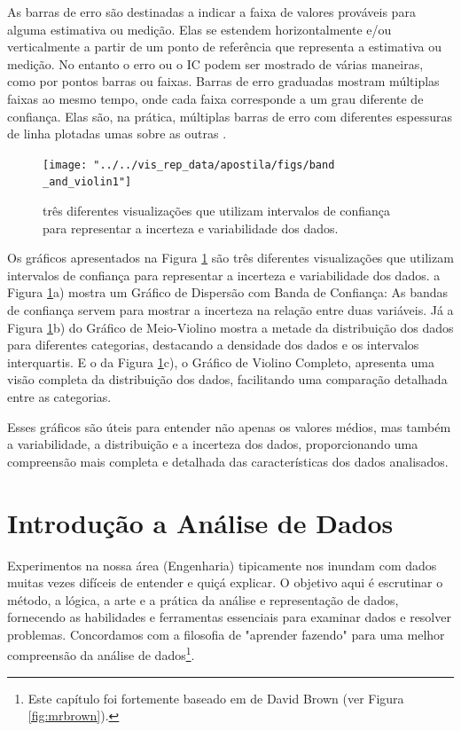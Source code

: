 \documentclass[article]{memoir}
\begin{document}
As barras de erro são destinadas a indicar a faixa de valores prováveis para alguma estimativa ou medição. Elas se estendem horizontalmente e/ou verticalmente a partir de um ponto de referência que representa a estimativa ou medição. No entanto o  erro ou o IC podem ser mostrado de várias maneiras, como por pontos barras ou faixas. Barras de erro graduadas mostram múltiplas faixas ao mesmo tempo, onde cada faixa corresponde a um grau diferente de confiança. Elas são, na prática, múltiplas barras de erro com diferentes espessuras de linha plotadas umas sobre as outras \cite{Wilke2019}.

\begin{figure}[ht]
	\centering
	\texttt{[image: "../../vis\_rep\_data/apostila/figs/band \_and\_violin1"]}
	\caption{três diferentes visualizações que utilizam intervalos de confiança para representar a incerteza e variabilidade dos dados.}
	\label{fig:band-andviolin1}
\end{figure}
Os gráficos apresentados na Figura \ref{fig:band-andviolin1}  são três diferentes visualizações que utilizam intervalos de confiança para representar a incerteza e variabilidade dos dados.
a Figura \ref{fig:band-andviolin1}a) mostra um Gráfico de Dispersão com Banda de Confiança: As bandas de confiança servem para mostrar a incerteza na relação entre duas variáveis. Já a Figura \ref{fig:band-andviolin1}b) do Gráfico de Meio-Violino mostra a metade da distribuição dos dados para diferentes categorias, destacando a densidade dos dados e os intervalos interquartis.
 E o da Figura \ref{fig:band-andviolin1}c), o Gráfico de Violino Completo, apresenta uma visão completa da distribuição dos dados, facilitando uma comparação detalhada entre as categorias.

Esses gráficos são úteis para entender não apenas os valores médios, mas também a variabilidade, a distribuição e a incerteza dos dados, proporcionando uma compreensão mais completa e detalhada das características dos dados analisados.
\chapter{Introdução a Análise de Dados}

Experimentos na nossa área (Engenharia) tipicamente nos inundam com dados muitas vezes difíceis de entender e quiçá explicar. O objetivo aqui é escrutinar o método, a lógica, a arte e a prática da análise e representação de dados, fornecendo as habilidades e ferramentas essenciais para examinar dados e resolver problemas. Concordamos com a filosofia de "aprender fazendo" para uma melhor compreensão da análise de dados\footnote{Este capítulo foi fortemente baseado em \cite{brown2021statistics} de David Brown  (ver Figura \ref{fig:mrbrown}).}.
\end{document}
